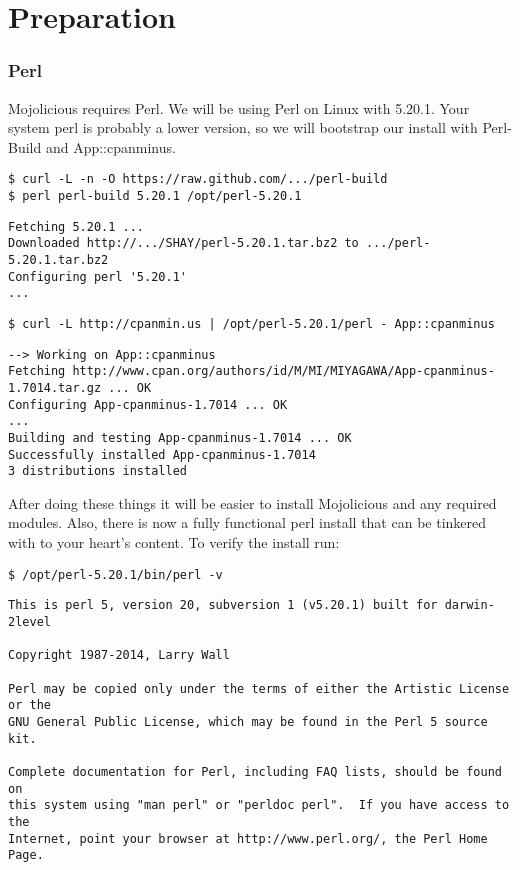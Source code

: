 \documentclass[16pt,pdftex]{book}
\begin{document}
\chapter*{Preparation}

\subsection{Perl}

Mojolicious requires Perl.  We will be using Perl on Linux with 5.20.1.  Your
system perl is probably a lower version, so we will bootstrap our install with 
Perl-Build and App::cpanminus.

\begin{lstlisting}[style=BashInputStyle]
$ curl -L -n -O https://raw.github.com/.../perl-build
$ perl perl-build 5.20.1 /opt/perl-5.20.1
\end{lstlisting}

\begin{lstlisting}[style=BashOutputStyle]
Fetching 5.20.1 ...
Downloaded http://.../SHAY/perl-5.20.1.tar.bz2 to .../perl-5.20.1.tar.bz2
Configuring perl '5.20.1'
...
\end{lstlisting}

\begin{lstlisting}[style=BashInputStyle]
$ curl -L http://cpanmin.us | /opt/perl-5.20.1/perl - App::cpanminus
\end{lstlisting}

\begin{lstlisting}[style=BashOutputStyle]
--> Working on App::cpanminus
Fetching http://www.cpan.org/authors/id/M/MI/MIYAGAWA/App-cpanminus-1.7014.tar.gz ... OK
Configuring App-cpanminus-1.7014 ... OK
...
Building and testing App-cpanminus-1.7014 ... OK
Successfully installed App-cpanminus-1.7014
3 distributions installed
\end{lstlisting}

After doing these things it will be easier to install Mojolicious and any required modules.
Also, there is now a fully functional perl install that can be tinkered with to your heart's content.
To verify the install run:

\begin{lstlisting}[style=BashInputStyle]
$ /opt/perl-5.20.1/bin/perl -v
\end{lstlisting}

\begin{lstlisting}[style=BashOutputStyle]
This is perl 5, version 20, subversion 1 (v5.20.1) built for darwin-2level

Copyright 1987-2014, Larry Wall

Perl may be copied only under the terms of either the Artistic License or the
GNU General Public License, which may be found in the Perl 5 source kit.

Complete documentation for Perl, including FAQ lists, should be found on
this system using "man perl" or "perldoc perl".  If you have access to the
Internet, point your browser at http://www.perl.org/, the Perl Home Page.
\end{lstlisting}
\end{document}
